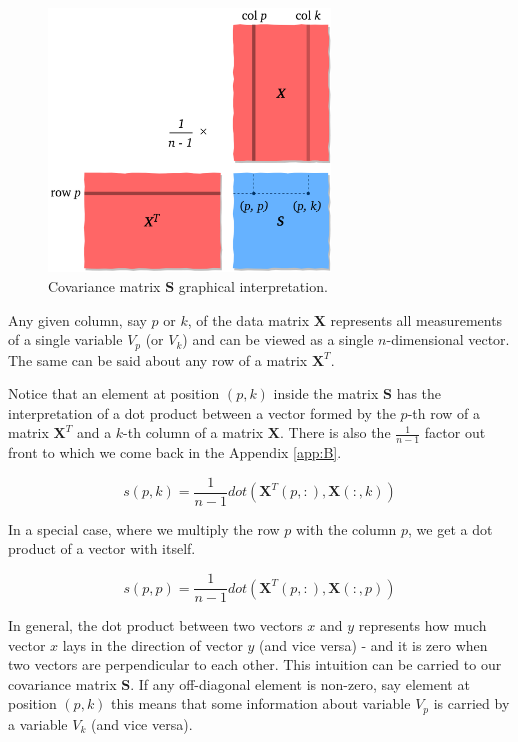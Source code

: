 \documentclass[10pt,twocolumn]{article}
\begin{document}
\begin{figure}[H]
\centering\includegraphics[width=7.5cm]{cov-matrix.png}
\caption{Covariance matrix $\bm{S}$ graphical interpretation.}
\label{fig:covariance-matrix}
\end{figure}

Any given column, say $p$ or $k$, of the data matrix $\bm{X}$ represents all measurements of a single variable $V_p$ (or $V_k$) and can be viewed as a single $n$-dimensional vector. The same can be said about any row of a matrix $\bm{X}^T$.

Notice that an element at position $(p,k)$ inside the matrix $\bm{S}$ has the interpretation of a dot product between a vector formed by the $p$-th row of a matrix $\bm{X}^T$ and a $k$-th column of a matrix $\bm{X}$. There is also the $\frac{1}{n-1}$ factor out front to which we come back in the Appendix \ref{app:B}.

\begin{equation}
s(p,k) = \frac{1}{n-1} dot( \bm{X}^T(p, :), \bm{X}(:,k))
\end{equation}

In a special case, where we multiply the row $p$ with the column $p$, we get a dot product of a vector with itself.

\begin{equation}
s(p,p) = \frac{1}{n-1} dot( \bm{X}^T(p, :), \bm{X}(:,p))
\end{equation}

In general, the dot product between two vectors $x$ and $y$ represents how much vector $x$ lays in the direction of vector $y$ (and vice versa) - and it is zero when two vectors are perpendicular to each other. This intuition can be carried to our covariance matrix $\bm{S}$. If any off-diagonal element is non-zero, say element at position $(p,k)$ this means that some information about variable $V_p$ is carried by a variable $V_k$ (and vice versa).
\end{document}
